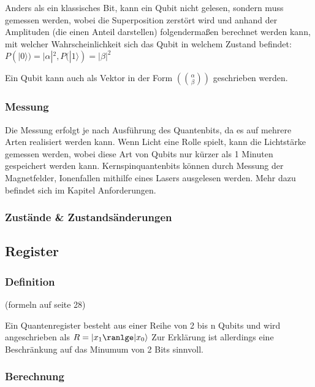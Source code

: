 Anders als ein klassisches Bit, kann ein Qubit nicht gelesen, sondern muss gemessen werden, wobei die Superposition zerstört wird und anhand der Amplituden (die einen Anteil darstellen) folgendermaßen berechnet werden kann, mit welcher Wahrscheinlichkeit sich das Qubit in welchem Zustand befindet: $P(|0\rangle) = |\alpha|^2, P(|1\rangle) = |\beta|^2$

Ein Qubit kann auch als Vektor in der Form $(\alpha \choose \beta)$ geschrieben werden.

\subsubsection{Messung}
\label{sec:bit_messung}

Die Messung erfolgt je nach Ausführung des Quantenbits, da es auf mehrere Arten realisiert werden kann. Wenn Licht eine Rolle spielt, kann die Lichtstärke gemessen werden, wobei diese Art von Qubits nur kürzer als 1 Minuten gespeichert werden kann. Kernspinquantenbits können durch Messung der Magnetfelder, Ionenfallen mithilfe eines Lasers ausgelesen werden. Mehr dazu befindet sich im Kapitel Anforderungen.

\subsubsection{Zustände \& Zustandsänderungen}
\label{sec:zustaende}





\subsection{Register}
\label{sec:register}





\subsubsection{Definition}
\label{sec:register_definition}
(formeln auf seite 28)

Ein Quantenregister besteht aus einer Reihe von 2 bis n Qubits und wird angeschrieben als $R = |x_1\ranlge|x_0\rangle$
Zur Erklärung ist allerdings eine Beschränkung auf das Minumum von 2 Bits sinnvoll.

\subsubsection{Berechnung}
\label{sec:register_berechnung}

